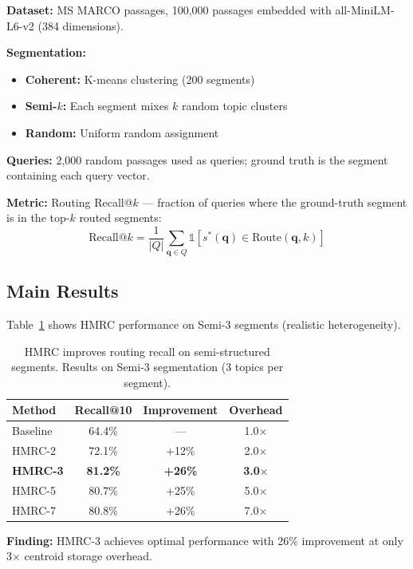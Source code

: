 \documentclass[sigconf, nonacm]{acmart}
\begin{document}
\textbf{Dataset:} MS MARCO passages, 100,000 passages embedded with all-MiniLM-L6-v2 (384 dimensions).

\textbf{Segmentation:} 
\begin{itemize}
    \item \textbf{Coherent:} K-means clustering (200 segments)
    \item \textbf{Semi-$k$:} Each segment mixes $k$ random topic clusters
    \item \textbf{Random:} Uniform random assignment
\end{itemize}

\textbf{Queries:} 2,000 random passages used as queries; ground truth is the segment containing each query vector.

\textbf{Metric:} Routing Recall@$k$ --- fraction of queries where the ground-truth segment is in the top-$k$ routed segments:
\begin{equation}
\text{Recall@}k = \frac{1}{|Q|} \sum_{\mathbf{q} \in Q} \mathbb{1}[s^*(\mathbf{q}) \in \text{Route}(\mathbf{q}, k)]
\end{equation}

\subsection{Main Results}

Table~\ref{tab:main} shows HMRC performance on Semi-3 segments (realistic heterogeneity).

\begin{table}[h]
\caption{HMRC improves routing recall on semi-structured segments. Results on Semi-3 segmentation (3 topics per segment).}
\label{tab:main}
\begin{tabular}{lccc}
\toprule
\textbf{Method} & \textbf{Recall@10} & \textbf{Improvement} & \textbf{Overhead} \\
\midrule
Baseline & 64.4\% & --- & 1.0$\times$ \\
HMRC-2 & 72.1\% & +12\% & 2.0$\times$ \\
\textbf{HMRC-3} & \textbf{81.2\%} & \textbf{+26\%} & \textbf{3.0$\times$} \\
HMRC-5 & 80.7\% & +25\% & 5.0$\times$ \\
HMRC-7 & 80.8\% & +26\% & 7.0$\times$ \\
\bottomrule
\end{tabular}
\end{table}

\textbf{Finding:} HMRC-3 achieves optimal performance with 26\% improvement at only 3$\times$ centroid storage overhead.
\end{document}
